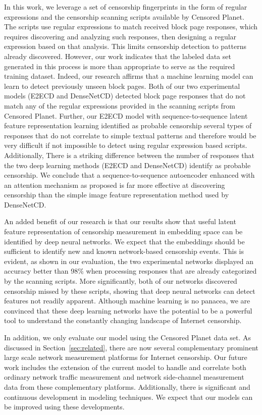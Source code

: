 In this work, we leverage a set of censorship fingerprints in the form of
regular expressions and the censorship scanning scripts available by Censored
Planet.  The scripts use regular expressions to match received block page
responses, which requires discovering and analyzing such responses, then
designing a regular expression based on that analysis. This limits censorship
detection to patterns already discovered. However, our work indicates that the
labeled data set generated in this process is more than appropriate to serve as
the required training dataset. Indeed, our research affirms that a machine
learning model can learn to detect previously unseen block pages.  Both of our
two experimental models (E2ECD and DenseNetCD) detected block page responses
that do not match any of the regular expressions provided in the scanning
scripts from Censored Planet.  Further, our E2ECD model with
sequence-to-sequence latent feature representation learning identified as
probable censorship several types of responses that do not correlate to simple
textual patterns and therefore would be very difficult if not impossible to
detect using regular expression based scripts. Additionally, There is
a striking difference between the number of responses that the two deep
learning methods (E2ECD and DenseNetCD) identify as probable censorship. We
conclude that a sequence-to-sequence autoencoder enhanced with an attention 
mechanism as proposed is far
more effective at discovering censorship than the simple image feature
representation method used by DenseNetCD.

An added benefit of our research is that our results show that useful latent feature
representation of censorship measurement in embedding space can be identified
by deep neural networks. We expect that the embeddings should be sufficient to
identify new and known network-based censorship events. This is evident, as
shown in our evaluation, the two experimental networks displayed an accuracy
better than 98\% when processing responses that are already categorized by the
scanning scripts.  More significantly, both of our networks
discovered censorship missed by these scripts, showing that deep neural
networks can detect features not readily apparent.  Although machine learning
is no panacea, we are convinced that these deep learning networks have the
potential to be a powerful tool to understand the constantly changing landscape
of Internet censorship.


In addition, we only evaluate our model using the Censored Planet data set.  As
discussed in Section~\ref{sec:related}, there are now several complementary
prominent large scale network measurement platforms for Internet censorship.
Our future work includes the extension of the current model to handle and correlate
both ordinary network traffic measurement and network side-channel measurement
data from these complementary platforms. Additionally, there is significant and continuous
development in modeling techniques. We expect that our models can be improved using these
developments.

